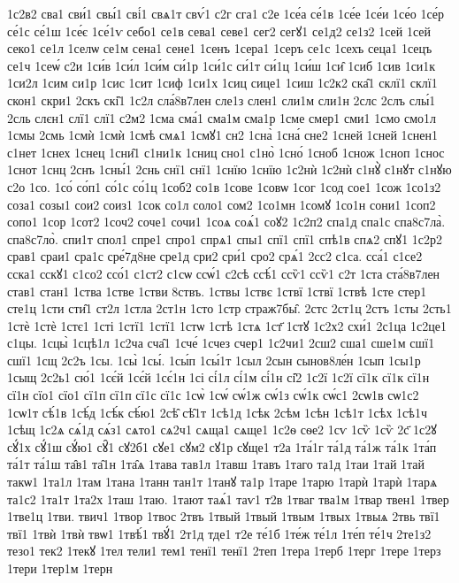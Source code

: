 {1с2в2
сва1
сви́1
свы́1
сві́1
свѧ1т
свѵ́1
с2г
сга1
с2е
1се́а
се́1в
1се́е
1се́и
1се́о
1се́р
се́1с
се́1ш
1се́є
1се́1ѵ
себо1
се1в
сева1
севе1
сег2
сегꙋ1
се1д2
се1з2
1сей
1сей
секо1
се1л
1селѡ
се1м
сена1
сене1
1сенъ
1сера1
1серъ
се1с
1сехъ
сеца1
1сецъ
се1ч
1сеѡ́
с2и
1си́в
1си́л
1си́м
си́1р
1си́1с
си́1т
си́1ц
1си́ш
1си̑
1сиб
1сив
1си1к
1си2л
1сим
си1р
1сис
1сит
1сиф
1си1х
1сиц
сице1
1сиш
1с2к2
ска̑1
склї1
склї1
скон1
скри1
2скъ
скі̑1
1с2л
сла́8в7лен
сле1з
слен1
сли1м
сли1н
2слс
2слъ
слы́1
2сль
слєн1
слї1
слї1
с2м2
1сма
сма́1
сма1м
сма1р
1сме
смер1
сми1
1смо
смо1л
1смы
2смь
1смѝ
1смѝ
1смѣ
смѧ1
1смꙋ1
сн2
1сна̀
1сна́
сне2
1сней
1сней
1снен1
с1нет
1снех
1снец
1сни̑1
с1ни1к
1сниц
сно1
с1но̀
1сно́
1сноб
1снож
1сноп
1снос
1снот
1снц
2снъ
1сны́1
2снь
снї1
снї1
1снїю
1снїю
1с2нѝ
1с2нѝ
с1нꙋ̀
с1нꙋт
с1нꙋю
с2о
1со.
1со́
со́п1
со́1с
со́1ц
1соб2
со1в
1сове
1совѡ
1сог
1сод
сое1
1сож
1со1з2
соза1
созы1
сои2
соиз1
1сок
со1л
соло1
сом2
1со1мн
1сомꙋ
1со1н
сони1
1соп2
сопо1
1сор
1сот2
1соч2
соче1
сочи1
1соѧ
соѧ́1
соꙋ2
1с2п2
спа1д
спа1с
спа8с7ла̀.
спа8с7ло̀.
спи1т
спол1
спре1
спро1
спрѧ1
спы1
спї1
спї1
спѣ1в
спѧ2
спꙋ1
1с2р2
срав1
сраи1
сра1с
сре́7д8не
сре1д
сри2
сри́1
сро2
срѧ́1
2сс2
с1са.
сса́1
с1се2
сска1
сскꙋ1
с1со2
ссо́1
с1ст2
с1сѡ
ссѡ́1
с2сѣ
ссѣ́1
ссѷ1
ссѷ1
с2т
1ста
ста́8в7лен
став1
стан1
1ства
1стве
1стви
8ствъ.
1ствы
1ствє
1ствї
1ствї
1ствѣ
1сте
стер1
сте1ц
1сти
сти̑1
ст2л
1стла
2ст1н
1сто
1стр
страж7бы̑.
2стс
2ст1ц
2стъ
1сты
2сть1
1стѐ
1стѐ
1стє1
1сті
1стї1
1стї1
1стѡ
1стѣ
1стѧ
1ст҃
1стꙋ
1с2х2
схи́1
2с1ца
1с2це1
с1цы.
1сцы̀
1сцѣ1л
1с2ча
сча̑1
1сче́
1счез
счер1
1с2чи1
2сш2
сша1
сше1м
сшї1
сшї1
1сщ
2с2ъ
1сы.
1сы̀
1сы́.
1сы́п
1сы́1т
1сыл
2сын
сынов8ле́н
1сып
1сы1р
1сыщ
2с2ь1
сю́1
1сє́й
1сє́й
1сє́1н
1сі
сі́1л
сі́1м
сі́1н
сі̑2
1с2ї
1с2ї
сї1к
сї1к
сї1н
сї1н
сїо1
сїо1
сї1п
сї1п
сї1с
сї1с
1сѡ̀
1сѡ́
сѡ́1ж
сѡ́1з
сѡ́1к
сѡ́с1
2сѡ1в
сѡ1с2
1сѡ1т
сѣ́1в
1сѣ́д
1сѣ́к
сѣ́ю1
2сѣ̑
сѣ̑1т
1сѣ1д
1сѣк
2сѣм
1сѣн
1сѣ1т
1сѣх
1сѣ1ч
1сѣщ
1с2ѧ
сѧ́1д
сѧ́з1
сѧто1
сѧ2ч1
сѧща1
сѧще1
1с2ѳ
сѳе2
1сѵ
1сѷ
1сѷ
2с҃
1с2ꙋ
сꙋ́1х
сꙋ́1ш
сꙋ́ю1
сꙋ̑1
сꙋ2б1
сꙋе1
сꙋм2
сꙋ1р
сꙋще1
т2а
1та́1г
та́1д
та́1ж
та́1к
1та́п
та́1т
та́1ш
та̑в1
та̑1н
1та̑ѧ
1тава
тав1л
1тавш
1тавъ
1таго
та1д
1таи
1тай
1тай
такѡ1
1та1л
1там
1тана
1танн
тан1т
1танꙋ
та1р
1таре
1тарю
1тарѝ
1тарѝ
1тарѧ
та1с2
1та1т
1та2х
1таш
1таю.
1тают
таѧ́1
таѵ1
т2в
1тваг
тва1м
1твар
твен1
1твер
1тве1ц
1тви.
твич1
1твор
1твос
2твъ
1твый
1твый
1твым
1твых
1твыѧ
2твь
твї1
твї1
1твѝ
1твѝ
твѡ1
1твѣ́1
твꙋ́1
2т1д
тде1
т2е
те́1б
1те́ж
те́1л
1те́п
те́1ч
2те1з2
тезо1
тек2
1текꙋ
1тел
тели1
тем1
тенї1
тенї1
2теп
1тера
1терб
1терг
1тере
1терз
1тери
1тер1м
1терн
}
